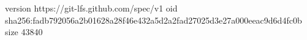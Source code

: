 version https://git-lfs.github.com/spec/v1
oid sha256:fadb792056a2b01628a28f46e432a5d2a2fad27025d3e27a000eeac9d6d4fc0b
size 43840

